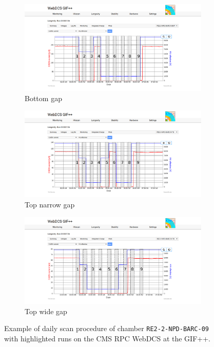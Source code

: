 	\begin{figure}[H]
    	\begin{subfigure}{\linewidth}
			\centering
    		\includegraphics[width = .9\linewidth]{fig/chapt5/Daily-rate-scan-BOT.png}
        	\caption{\label{fig:Daily-Scan-Proc:A} Bottom gap}
    	\end{subfigure}
    	\begin{subfigure}{\linewidth}
			\centering
    		\includegraphics[width = .9\linewidth]{fig/chapt5/Daily-rate-scan-TN.png}
        	\caption{\label{fig:Daily-Scan-Proc:B} Top narrow gap}
    	\end{subfigure}
    	\begin{subfigure}{\linewidth}
			\centering
    		\includegraphics[width = .9\linewidth]{fig/chapt5/Daily-rate-scan-TW.png}
        	\caption{\label{fig:Daily-Scan-Proc:C} Top wide gap}
    	\end{subfigure}
		\caption{\label{fig:Daily-Scan-Proc} Example of daily scan procedure of chamber \texttt{RE2-2-NPD-BARC-09} with highlighted runs on the CMS RPC WebDCS at the GIF++.}
	\end{figure}
	
